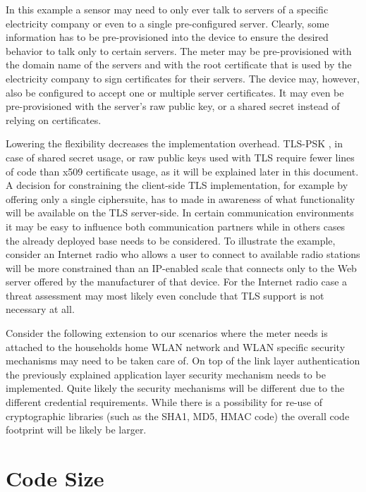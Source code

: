 \documentclass[a4paper, 10pt]{IEEEtran}
\begin{document}
In this example a sensor may need to only ever talk to servers of a specific electricity company or even to a single pre-configured server. Clearly, some information has to be pre-provisioned into the device to ensure the desired behavior to talk only to certain servers. The meter may be pre-provisioned with the domain name of the servers and with the root certificate that is used by the electricity company to sign certificates for their servers. The device may, however, also be configured to accept one or multiple server certificates. It may even be pre-provisioned with the server's raw public key, or a shared secret instead of relying on certificates. 

Lowering the flexibility decreases the implementation overhead. TLS-PSK \cite{rfc4279}, in case of shared secret usage, or raw public keys used with TLS \cite{I-d.ietf-tls-oob-pubkey} require fewer lines of code than x509 certificate usage, as it will be explained later in this document. A decision for constraining the client-side TLS implementation, for example by offering only a single ciphersuite, has to made in awareness of what functionality will be available on the TLS server-side. In certain communication environments it may be easy to influence both communication partners while in others cases the already deployed base needs to be considered. To illustrate the example, consider an Internet radio who allows a user to connect to available radio stations will be more constrained than an IP-enabled scale that connects only to the Web server offered by the manufacturer of that device. For the Internet radio case a threat assessment may most likely even conclude that TLS support is not necessary at all. 

Consider the following extension to our scenarios where the meter needs is attached to the households home WLAN network and WLAN specific security mechanisms may need to be taken care of. On top of the link layer authentication the previously explained application layer security mechanism needs to be implemented. Quite likely the security mechanisms will be different due to the different credential requirements. While there is a possibility for re-use of cryptographic libraries (such as the SHA1, MD5, HMAC code) the overall code footprint will be likely be larger. 

\section{Code Size}
\end{document}
